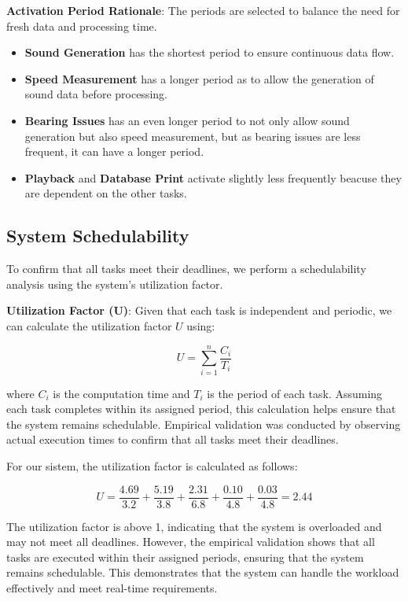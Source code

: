 \documentclass[a4paper,12pt]{article}
\begin{document}
\textbf{Activation Period Rationale}: The periods are selected to balance the need for fresh data and processing time.
\begin{itemize}
    \item \textbf{Sound Generation} has the shortest period to ensure continuous data flow.
    \item \textbf{Speed Measurement} has a longer period as to allow the generation of sound data before processing.
    \item \textbf{Bearing Issues} has an even longer period to not only allow sound generation but also speed measurement, but as bearing issues are less frequent, it can have a longer period.
    \item \textbf{Playback} and \textbf{Database Print} activate slightly less frequently beacuse they are dependent on the other tasks.
\end{itemize}

\subsection{System Schedulability}

To confirm that all tasks meet their deadlines, we perform a schedulability analysis using the system's utilization factor.

\textbf{Utilization Factor (U)}: Given that each task is independent and periodic, we can calculate the utilization factor \( U \) using:

\[
U = \sum_{i=1}^n \frac{C_i}{T_i}
\]

where \( C_i \) is the computation time and \( T_i \) is the period of each task. Assuming each task completes within its assigned period, this calculation helps ensure that the system remains schedulable. Empirical validation was conducted by observing actual execution times to confirm that all tasks meet their deadlines.

For our sistem, the utilization factor is calculated as follows:

\[
U = \frac{4.69}{3.2} + \frac{5.19}{3.8} + \frac{2.31}{6.8} + \frac{0.10}{4.8} + \frac{0.03}{4.8} = 2.44
\]

The utilization factor is above 1, indicating that the system is overloaded and may not meet all deadlines. However, the empirical validation shows that all tasks are executed within their assigned periods, ensuring that the system remains schedulable. This demonstrates that the system can handle the workload effectively and meet real-time requirements.
\end{document}
